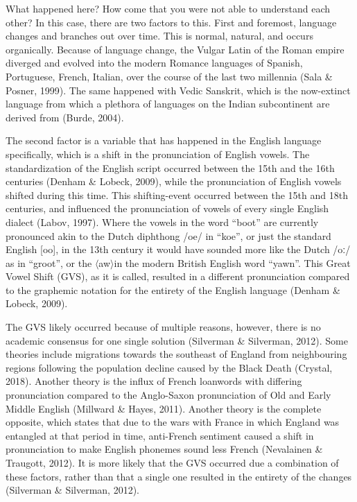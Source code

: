  

What happened here? How come that you were not able to understand each other? In this case, there are two factors to this. First and foremost, language changes and branches out over time. This is normal, natural, and occurs organically. Because of language change, the Vulgar Latin of the Roman empire diverged and evolved into the modern Romance languages of Spanish, Portuguese, French, Italian, over the course of the last two millennia (Sala \& Posner, 1999). The same happened with Vedic Sanskrit, which is the now-extinct language from which a plethora of languages on the Indian subcontinent are derived from (Burde, 2004). 

The second factor is a variable that has happened in the English language specifically, which is a shift in the pronunciation of English vowels. The standardization of the English script occurred between the 15th and the 16th centuries (Denham \& Lobeck, 2009), while the pronunciation of English vowels shifted during this time. This shifting-event occurred between the 15th and 18th centuries, and influenced the pronunciation of vowels of every single English dialect (Labov, 1997). Where the vowels in the word “boot” are currently pronounced akin to the Dutch diphthong /oe/ in “koe”, or just the standard English [oo], in the 13th century it would have sounded more like the Dutch /oː/ as in “groot”, or the $\langle$aw$\rangle$\footnotemark in the modern British English word “yawn”. This Great Vowel Shift (GVS), as it is called, resulted in a different pronunciation compared to the graphemic notation for the entirety of the English language (Denham \& Lobeck, 2009). 


The GVS likely occurred because of multiple reasons, however, there is no academic consensus for one single solution (Silverman \& Silverman, 2012). Some theories include migrations towards the southeast of England from neighbouring regions following the population decline caused by the Black Death (Crystal, 2018). Another theory is the influx of French loanwords with differing pronunciation compared to the Anglo-Saxon pronunciation of Old and Early Middle English (Millward \& Hayes, 2011). Another theory is the complete opposite, which states that due to the wars with France in which England was entangled at that period in time, anti-French sentiment caused a shift in pronunciation to make English phonemes sound less French (Nevalainen \& Traugott, 2012). It is more likely that the GVS occurred due a combination of these factors, rather than that a single one resulted in the entirety of the changes (Silverman \& Silverman, 2012). 

